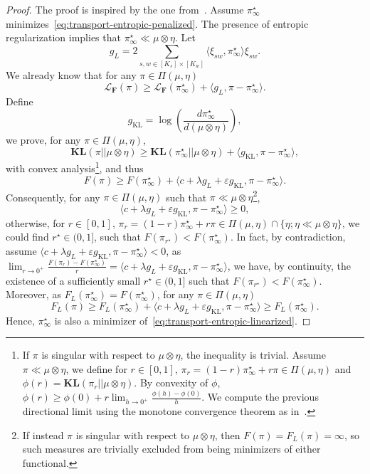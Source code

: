\documentclass{article}
\newcommand{\kl}{\mathbf{KL}}
\theoremstyle{definition}
\newcommand{\pistar}{\pi_\infty^\star}
\newcommand{\klpop}[1]{\kl(#1||\mu\otimes\eta)}
\begin{document}
\begin{proof}
    The proof is inspired by the one from~\citep[Proposition 2.1]{rakotomamonjy2015generalized}.
    Assume $\pistar$ minimizes~\cref{eq:transport-entropic-penalized}. The presence of entropic regularization implies that $\pistar \ll \mu \otimes \eta$.
    Let 
    \[
        g_L = 2 \sum_{s,w \in [K_s] \times [K_w]} \langle \xi_{sw} , \pistar \rangle \xi_{sw}.
    \]
    We already know that for any $\pi \in \Pi(\mu,\eta)$
    \[
        \mathcal{L}_\mathbf{F}(\pi) \geq \mathcal{L}_\mathbf{F}(\pistar) + \langle g_L , \pi - \pistar \rangle.
    \]
    Define
    \[
        g_{\text{KL}} = \log\left(\frac{d\pistar}{d(\mu\otimes\eta)}\right),
    \]
    we prove, for any $\pi \in \Pi(\mu,\eta)$,
    \[
        \klpop{\pi} \geq \klpop{\pistar} + \langle g_{\text{KL}} , \pi - \pistar \rangle,
    \]
    with convex analysis\footnote{If $\pi$ is singular with respect to $\mu \otimes \eta$, the inequality is trivial. Assume $\pi \ll \mu \otimes \eta$, we define for $r\in[0,1]$, $\pi_r = (1-r)\pistar + r \pi \in \Pi(\mu,\eta)$ and $\phi(r) = \klpop{\pi_r}$. By convexity of $\phi$, $\phi(r) \geq \phi(0) + r \lim_{h \to 0^+} \frac{\phi(h) - \phi(0)}{h}$. We compute the previous directional limit using the monotone convergence theorem as in~\citet[Lemma 2.1]{CSZISAR_SUBDIFF}.},
    and thus
    \[
        F(\pi) \geq F(\pistar) + \langle c + \lambda g_L + \varepsilon g_{\text{KL}} , \pi - \pistar \rangle.
    \]
    Consequently, for any $\pi \in \Pi(\mu,\eta)$ such that  $\pi \ll \mu \otimes \eta$\footnote{If instead $\pi$ is singular with respect to $\mu \otimes \eta$, then $F(\pi) = F_L(\pi) = \infty$, so such measures are trivially excluded from being minimizers of either functional.},
    \[
        \langle c + \lambda g_L + \varepsilon g_{\text{KL}} , \pi - \pistar \rangle \geq 0,
    \]
    otherwise, for $r\in[0,1]$, $\pi_r = (1-r)\pistar + r \pi \in \Pi(\mu, \eta) \cap \{\eta; \eta \ll \mu \otimes \eta\}$, we could find $r^\star \in (0,1]$, such that $F(\pi_{r^\star}) < F(\pistar)$. In fact, by contradiction, assume $\langle c + \lambda g_L + \varepsilon g_{\text{KL}} , \pi - \pistar \rangle < 0$, as $\lim_{r \to 0^+} \frac{F(\pi_r) - F(\pistar)}{r} = \langle c + \lambda g_L + \varepsilon g_{\text{KL}} , \pi - \pistar \rangle$, we have, by continuity, the existence of a sufficiently small $r^\star \in (0, 1]$ such that $F(\pi_{r^\star}) < F(\pistar)$.
    Moreover, as $F_L(\pistar) = F(\pistar)$, for any $\pi \in \Pi(\mu,\eta)$
    \[
        F_L(\pi) \geq F_L(\pistar) + \langle c + \lambda g_L + \varepsilon g_{\text{KL}} , \pi - \pistar \rangle \geq F_L(\pistar).
    \]
    Hence, $\pistar$ is also a minimizer of~\cref{eq:transport-entropic-linearized}.
\end{proof}
\end{document}
